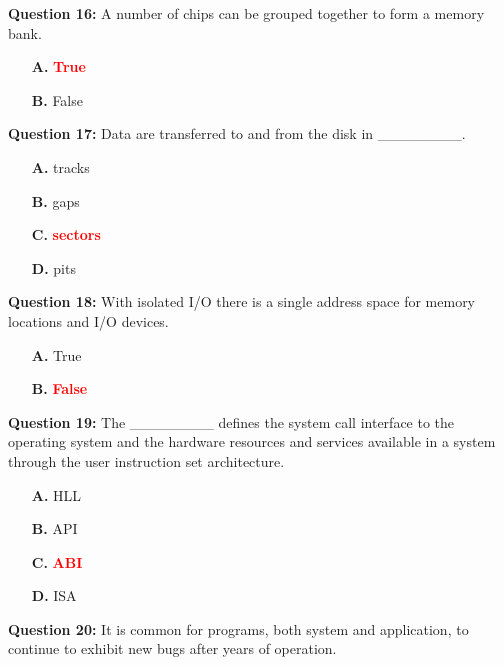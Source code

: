 \documentclass[12pt,a4paper]{article}
\begin{document}
\textbf{Question 16:} A number of chips can be grouped together to form a memory bank.

\begin{itemize}
    \item[\textbf{A.}] \textcolor{red}{\textbf{True}}
    \item[\textbf{B.}] False
\end{itemize}

\vspace{0.5cm}

\textbf{Question 17:} Data are transferred to and from the disk in ________.

\begin{itemize}
    \item[\textbf{A.}] tracks
    \item[\textbf{B.}] gaps
    \item[\textbf{C.}] \textcolor{red}{\textbf{sectors}}
    \item[\textbf{D.}] pits
\end{itemize}

\vspace{0.5cm}

\textbf{Question 18:} With isolated I/O there is a single address space for memory locations and I/O devices.

\begin{itemize}
    \item[\textbf{A.}] True
    \item[\textbf{B.}] \textcolor{red}{\textbf{False}}
\end{itemize}

\vspace{0.5cm}

\textbf{Question 19:} The ________ defines the system call interface to the operating system and the hardware resources and services available in a system through the user instruction set architecture.

\begin{itemize}
    \item[\textbf{A.}] HLL
    \item[\textbf{B.}] API
    \item[\textbf{C.}] \textcolor{red}{\textbf{ABI}}
    \item[\textbf{D.}] ISA
\end{itemize}

\vspace{0.5cm}

\textbf{Question 20:} It is common for programs, both system and application, to continue to exhibit new bugs after years of operation.
\end{document}
